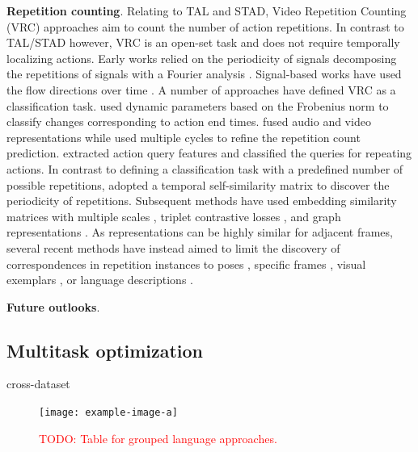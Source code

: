 \documentclass[smallextended,twocolumn,natbib]{svjour3}
\begin{document}
\noindent
\textbf{Repetition counting}. Relating to TAL and STAD, Video Repetition Counting (VRC) approaches aim to count the number of action repetitions. In contrast to TAL/STAD however, VRC is an open-set task and does not require temporally localizing actions. Early works relied on the periodicity of signals \citep{thangali2005periodic} decomposing the repetitions of signals with a Fourier analysis \citep{branzan2008generic,briassouli2007extraction,ousman2008segmentation,ross2000robust,pogalin2008visual}. Signal-based works have used the flow directions over time \citep{runia2018real}. A number of approaches have defined VRC as a classification task. \citet{lu2004repetitive} used dynamic parameters based on the Frobenius norm to classify changes corresponding to action end times.
\citet{zhang2021repetitive} fused audio and video representations while \citet{zhang2020context} used multiple cycles to refine the repetition count prediction. \citet{li2024efficient} extracted action query features and classified the queries for repeating actions. In contrast to defining a classification task with a predefined number of possible repetitions, \citet{dwibedi2020counting} adopted a temporal self-similarity matrix \citep{benabdelkader2004gait,junejo2010view,korner2013temporal} to discover the periodicity of repetitions. Subsequent methods have used embedding similarity matrices with multiple scales \citep{bacharidis2023repetition,hu2022transrac}, triplet contrastive losses \citep{destro2024cyclecl}, and graph representations \citep{panagiotakis2018unsupervised}. As representations can be highly similar for adjacent frames, several recent methods have instead aimed to limit the discovery of correspondences in repetition instances to poses \citep{ferreira2021deep,yao2023poserac}, specific frames \citep{li2024repetitive,zhao2024skim}, visual exemplars \citep{sinha2024every}, or language descriptions \citep{dwibedi2024ovr}.

\noindent
\textbf{Future outlooks}.

\noindent
\subsection{Multitask optimization}

cross-dataset
\citep{perrett2019ddlstm}
\citep{kapidis2019multitask} 
\citep{bansal2024videocon}



\begin{figure}[t]
    \centering
    \texttt{[image: example-image-a]}
    \caption{\textcolor{red}{TODO: Table for grouped language approaches.}}
\end{figure}
\end{document}
